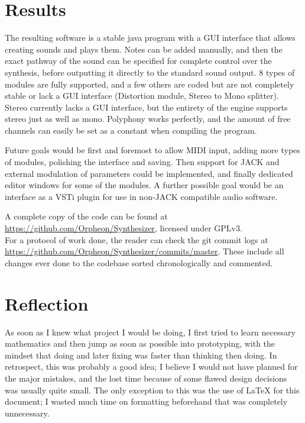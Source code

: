 \documentclass[11pt,a4paper]{article}
\begin{document}
\clearpage

\section{Results}

The resulting software is a stable java program with a GUI interface that allows creating sounds and plays them. Notes can be added manually, and then the exact pathway of the sound can be specified for complete control over the synthesis, before outputting it directly to the standard sound output. 8 types of modules are fully supported, and a few others are coded but are not completely stable or lack a GUI interface (Distortion module, Stereo to Mono splitter). Stereo currently lacks a GUI interface, but the entirety of the engine supports stereo just as well as mono. Polyphony works perfectly, and the amount of free channels can easily be set as a constant when compiling the program.

Future goals would be first and foremost to allow MIDI input, adding more types of modules, polishing the interface and saving. Then support for JACK and external modulation of parameters could be implemented, and finally dedicated editor windows for some of the modules. A further possible goal would be an interface as a VSTi plugin for use in non-JACK compatible audio software.

A complete copy of the code can be found at \url{https://github.com/Orpheon/Synthesizer}, licensed under GPLv3.\\
For a protocol of work done, the reader can check the git commit logs at \url{https://github.com/Orpheon/Synthesizer/commits/master}. These include all changes ever done to the codebase sorted chronologically and commented.

\section{Reflection}

As soon as I knew what project I would be doing, I first tried to learn necessary mathematics and then jump as soon as possible into prototyping, with the mindset that doing and later fixing was faster than thinking then doing. In retrospect, this was probably a good idea; I believe I would not have planned for the major mistakes, and the lost time because of some flawed design decisions was usually quite small. The only exception to this was the use of LaTeX for this document; I wasted much time on formatting beforehand that was completely unnecessary.
\end{document}
